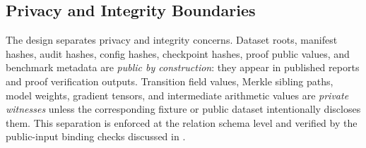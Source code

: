 \subsection{Privacy and Integrity Boundaries}

The design separates privacy and integrity concerns. Dataset roots, manifest
hashes, audit hashes, config hashes, checkpoint hashes, proof public values,
and benchmark metadata are \emph{public by construction}: they appear in
published reports and proof verification outputs. Transition field values,
Merkle sibling paths, model weights, gradient tensors, and intermediate
arithmetic values are \emph{private witnesses} unless the corresponding fixture
or public dataset intentionally discloses them. This separation is enforced at
the relation schema level and verified by the public-input binding checks
discussed in .
